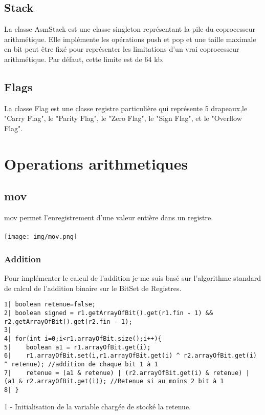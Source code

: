 \documentclass{article}
\begin{document}
\subsection{Stack}

La classe AsmStack est une classe singleton représentant la pile du coprocesseur arithmétique. Elle implémente les opérations push et pop et
une taille maximale en bit peut être fixé pour représenter les limitations d'un vrai coprocesseur arithmétique. Par défaut, cette limite est de 64 kb.

\subsection{Flags}

La classe Flag est une classe registre particulière qui représente 5 drapeaux,le "Carry Flag", le "Parity Flag", le "Zero Flag", le "Sign Flag", et le "Overflow Flag".

\section{Operations arithmetiques}
\subsection{mov}
mov permet l'enregistrement d'une valeur entière dans un registre.
\\
\\
\texttt{[image: img/mov.png]}

\newpage
\subsubsection{Addition}
Pour implémenter le calcul de l'addition je me suis basé sur l'algorithme standard de calcul de l'addition binaire sur le BitSet de Registres.

\begin{verbatim}
1| boolean retenue=false;
2| boolean signed = r1.getArrayOfBit().get(r1.fin - 1) && r2.getArrayOfBit().get(r2.fin - 1);
3|
4| for(int i=0;i<r1.arrayOfBit.size();i++){
5|    boolean a1 = r1.arrayOfBit.get(i);
6|    r1.arrayOfBit.set(i,r1.arrayOfBit.get(i) ^ r2.arrayOfBit.get(i) ^ retenue); //addition de chaque bit 1 à 1
7|    retenue = (a1 & retenue) | (r2.arrayOfBit.get(i) & retenue) | (a1 & r2.arrayOfBit.get(i)); //Retenue si au moins 2 bit à 1
8| }
\end{verbatim}

1 - Initialisation de la variable chargée de stocké la retenue.
\end{document}
